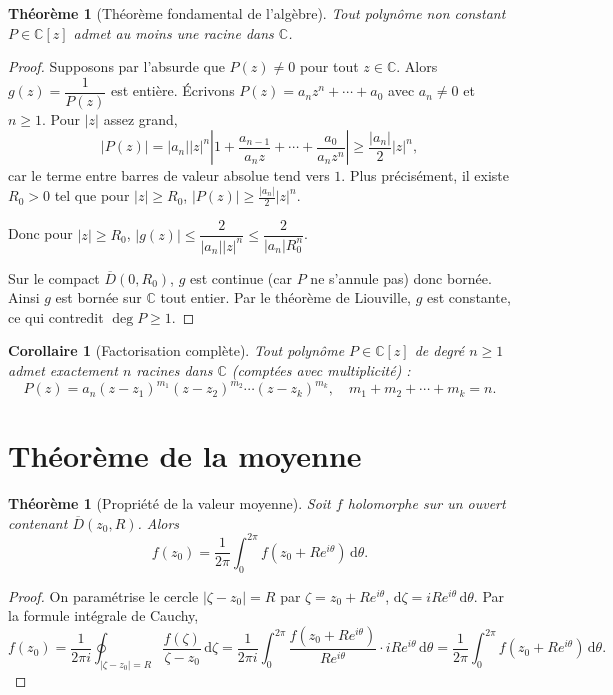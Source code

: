 \documentclass[12pt,a4paper,openany]{book}
\theoremstyle{definition}
\theoremstyle{plain}
\newtheorem{theoreme}[definition]{Théorème}
\newtheorem{corollaire}[definition]{Corollaire}
\theoremstyle{remark}
\newcommand{\C}{\mathbb{C}}
\newcommand{\dd}{\mathrm{d}}
\newcommand{\abs}[1]{\left|#1\right|}
\begin{document}
\begin{theoreme}[Théorème fondamental de l'algèbre]\label{thm:fta}
Tout polynôme non constant $P \in \C[z]$ admet au moins une racine dans $\C$.
\end{theoreme}

\begin{proof}
Supposons par l'absurde que $P(z) \neq 0$ pour tout $z \in \C$.
Alors $g(z) = \dfrac{1}{P(z)}$ est entière. Écrivons
$P(z) = a_n z^n + \cdots + a_0$ avec $a_n \neq 0$ et $n \geq 1$. Pour
$\abs{z}$ assez grand,
\[
  \abs{P(z)} = \abs{a_n}\abs{z}^n
  \abs{1 + \frac{a_{n-1}}{a_n z} + \cdots + \frac{a_0}{a_n z^n}}
  \geq \frac{\abs{a_n}}{2}\abs{z}^n,
\]
car le terme entre barres de valeur absolue tend vers $1$. Plus
précisément, il existe $R_0 > 0$ tel que pour $\abs{z} \geq R_0$,
$\abs{P(z)} \geq \frac{\abs{a_n}}{2}\abs{z}^n$.

Donc pour $\abs{z} \geq R_0$,
$\abs{g(z)} \leq \dfrac{2}{\abs{a_n}\abs{z}^n} \leq \dfrac{2}{\abs{a_n}R_0^n}$.

Sur le compact $\overline{D}(0, R_0)$, $g$ est continue (car $P$ ne
s'annule pas) donc bornée. Ainsi $g$ est bornée sur $\C$ tout entier.
Par le théorème de Liouville, $g$ est constante, ce qui contredit
$\deg P \geq 1$.
\end{proof}

\begin{corollaire}[Factorisation complète]\label{cor:factorisation-complete}
Tout polynôme $P \in \C[z]$ de degré $n \geq 1$ admet exactement $n$
racines dans $\C$ (comptées avec multiplicité) :
\[
  P(z) = a_n(z - z_1)^{m_1}(z - z_2)^{m_2}\cdots(z - z_k)^{m_k},
  \quad m_1 + m_2 + \cdots + m_k = n.
\]
\end{corollaire}

\section{Théorème de la moyenne}

\begin{theoreme}[Propriété de la valeur moyenne]\label{thm:mean-value}
Soit $f$ holomorphe sur un ouvert contenant $\overline{D}(z_0,R)$. Alors
\[
  f(z_0) = \frac{1}{2\pi}\int_0^{2\pi} f(z_0 + Re^{i\theta})\,\dd\theta.
\]
\end{theoreme}

\begin{proof}
On paramétrise le cercle $\abs{\zeta - z_0} = R$ par
$\zeta = z_0 + Re^{i\theta}$, $\dd\zeta = iRe^{i\theta}\,\dd\theta$.
Par la formule intégrale de Cauchy,
\[
  f(z_0) = \frac{1}{2\pi i}\oint_{\abs{\zeta - z_0}=R}
  \frac{f(\zeta)}{\zeta - z_0}\,\dd\zeta
  = \frac{1}{2\pi i}\int_0^{2\pi}
  \frac{f(z_0 + Re^{i\theta})}{Re^{i\theta}}\cdot iRe^{i\theta}\,\dd\theta
  = \frac{1}{2\pi}\int_0^{2\pi}f(z_0 + Re^{i\theta})\,\dd\theta.
\]
\end{proof}
\end{document}

